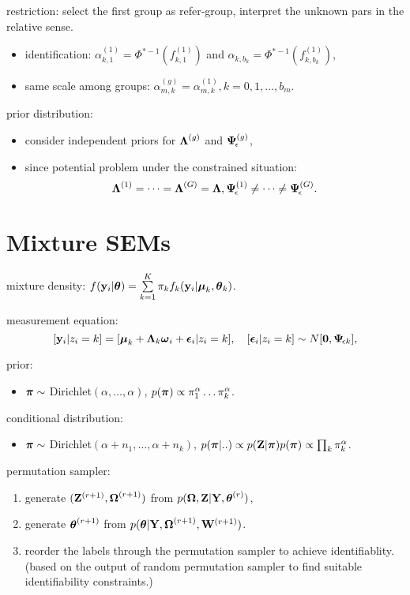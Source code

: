 restriction: select the first group as refer-group, interpret the unknown pars in the relative sense. \begin{itemize}
    \item identification: $\alpha_{k, 1}^{(1)} = \Phi^{* -\!1}(f^{(1)}_{k, 1})$ and $\alpha_{k, b_k} = \Phi^{* -\!1}(f^{(1)}_{k, b_k})$,
    \item \vspace{-.5ex} same scale among groups: $\alpha^{(g)}_{m,k} = \alpha^{(1)}_{m,k}, k = 0, 1, \dots, b_m$.
\end{itemize}

prior distribution: \begin{itemize}
    \item consider independent priors for $\boldsymbol{\Lambda}^{(g)}$ and $\boldsymbol{\Psi}_{\!\epsilon}^{(g)}$,
    \item [] since potential problem under the constrained situation: \[
        \boldsymbol{\Lambda}^{(1)} = \dots = \boldsymbol{\Lambda}^{(G)} = \boldsymbol{\Lambda}, \boldsymbol{\Psi}_{\!\epsilon}^{(1)} \neq \cdots \neq \boldsymbol{\Psi}_{\!\epsilon}^{(G)}.
    \]
\end{itemize}

\section*{Mixture SEMs}

\vspace{-2ex} mixture density: $f(\mathbf{y}_i \vert \boldsymbol{\theta}) = \sum\limits_{k = 1}^K \pi_k f_k(\mathbf{y}_i \vert \boldsymbol{\mu}_k, \boldsymbol{\theta}_k)$.

measurement equation: \[
    [\mathbf{y}_i \vert z_i = k]
    = [\boldsymbol{\mu}_k + \boldsymbol{\Lambda}_k \boldsymbol{\omega}_i + \boldsymbol{\epsilon}_i \vert z_i = k], 
    \quad [\boldsymbol{\epsilon}_i \vert z_i = k] \sim {N}[\mathbf{0}, \boldsymbol{\Psi}_{\!\epsilon k}] ,
\]

prior: \begin{itemize}
    \item $\boldsymbol{\pi} \sim $ Dirichlet$(\alpha, \dots, \alpha)$, $p(\boldsymbol{\pi}) \propto \pi_1^\alpha \dots \pi_k^\alpha$.
\end{itemize}

conditional distribution: \begin{itemize}
    \item $\boldsymbol{\pi} \sim $ Dirichlet$(\alpha + n_1, \dots, \alpha + n_k)$, $p(\boldsymbol{\pi} \vert .. ) \propto p(\mathbf{Z} \vert \boldsymbol{\pi}) p(\boldsymbol{\pi}) \propto \prod_k \pi_k^\alpha$.
\end{itemize}


permutation sampler: \begin{enumerate}
    \item generate $(\mathbf{Z}^{(r+1)}, \boldsymbol{\Omega}^{(r+1)})$ from $p(\boldsymbol{\Omega}, \mathbf{Z} \vert \mathbf{Y}, \boldsymbol{\theta}^{(r)})$,
    \item generate $\boldsymbol{\theta}^{(r+1)}$ from $p(\boldsymbol{\theta} \vert \mathbf{Y}, \boldsymbol{\Omega}^{(r+1)}, \mathbf{W}^{(r+1)})$.
    \item reorder the labels through the permutation sampler to achieve identifiablity. (based on the output of random permutation sampler to find suitable identifiability constraints.)
\end{enumerate}

